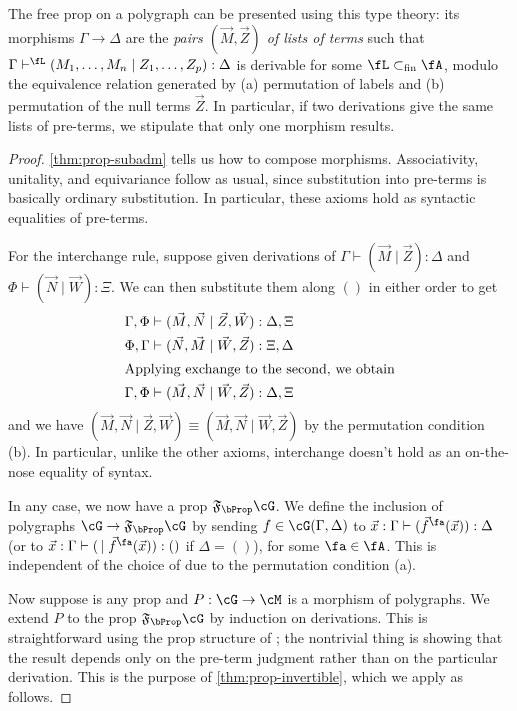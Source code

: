 \documentclass{book}
\def\finsubset{\subset_{\mathrm{fin}}}
\let\types\vdash
\newcommand{\F}[1]{\mathfrak{F}_{#1}}
\begin{document}
\begin{thm}\label{thm:prop-initial}
  The free prop on a polygraph can be presented using this type theory: its morphisms $\Gamma\to\Delta$ are the \emph{pairs $(\vec M,\vec Z)$ of lists of terms} such that $\Gamma\types^\fL (M_1,\dots,M_n \mid Z_1,\dots,Z_p):\Delta$ is derivable for some $\fL\finsubset\fA$, modulo the equivalence relation generated by (a) permutation of labels and (b) permutation of the null terms $\vec Z$.
  In particular, if two derivations give the same lists of pre-terms, we stipulate that only one morphism results.
\end{thm}
\begin{proof}
  \cref{thm:prop-subadm} tells us how to compose morphisms.
  Associativity, unitality, and equivariance follow as usual, since substitution into pre-terms is basically ordinary substitution.
  In particular, these axioms hold as syntactic equalities of pre-terms.

  For the interchange rule, suppose given derivations of $\Gamma\types (\vec M\mid\vec Z):\Delta$ and $\Phi\types (\vec N\mid\vec W):\Xi$.
  We can then substitute them along $()$ in either order to get
  \begin{align*}
    \Gamma,\Phi &\types (\vec M,\vec N\mid \vec Z,\vec W):\Delta,\Xi\\
    \Phi,\Gamma &\types (\vec N,\vec M\mid \vec W,\vec Z):\Xi,\Delta\\
\intertext{Applying exchange to the second, we obtain}
    \Gamma,\Phi &\types (\vec M,\vec N\mid \vec W,\vec Z):\Delta,\Xi
  \end{align*}
  and we have $(\vec M,\vec N\mid \vec Z,\vec W) \equiv (\vec M,\vec N\mid \vec W,\vec Z)$ by the permutation condition (b).
  In particular, unlike the other axioms, interchange doesn't hold as an on-the-nose equality of syntax.

  In any case, we now have a prop $\F\bProp\cG$.
  We define the inclusion of polygraphs $\cG\to \F\bProp\cG$ by sending $f\in\cG(\Gamma,\Delta)$ to $\vec x:\Gamma \types (\vec f^\fa(\vec x)):\Delta$ (or to $\vec x:\Gamma \types (\,\mid\vec f^\fa(\vec x)):()$ if $\Delta=()$), for some $\fa\in\fA$.
  This is independent of the choice of \fa due to the permutation condition (a).

  Now suppose \cM is any prop and $P:\cG\to\cM$ is a morphism of polygraphs.
  We extend $P$ to the prop $\F\bProp\cG$ by induction on derivations.
  This is straightforward using the prop structure of \cM; the nontrivial thing is showing that the result depends only on the pre-term judgment rather than on the particular derivation.
  This is the purpose of \cref{thm:prop-invertible}, which we apply as follows.


\end{proof}
\end{document}
